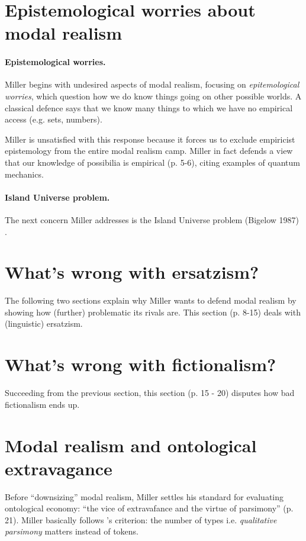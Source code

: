 \documentclass[
10pt, %
a4paper, %
twocolumn, %
landscape %
]{article}
\begin{document}
\section{Epistemological worries about modal realism}

\paragraph{Epistemological worries.}
 Miller begins with undesired aspects of modal realism, focusing on \emph{epitemological worries}, which question how we do know things going on other possible worlds.
 A classical defence says that we know many things to which we have no empirical access (e.g. sets, numbers).

 Miller is unsatisfied with this response because it forces us to exclude empiricist epistemology from the entire modal realism camp.
 Miller in fact defends a view that our knowledge of possibilia is empirical (p. 5-6), citing examples of quantum mechanics.

 \paragraph{Island Universe problem.}
 The next concern Miller addresses is the Island Universe problem (Bigelow 1987) \cite{Bigelow1987}.


\section{What's wrong with ersatzism?}
The following two sections explain why Miller wants to defend modal realism by showing how (further) problematic its rivals are. This section (p. 8-15) deals with (linguistic) ersatzism.

\section{What's wrong with fictionalism?}
Succeeding from the previous section, this section (p. 15 - 20) disputes how bad fictionalism ends up.

\section{Modal realism and ontological extravagance}
Before ``downsizing'' modal realism, Miller settles his standard for evaluating ontological economy: ``the vice of extravafance and the virtue of parsimony'' (p. 21).
Miller basically follows \cite{Lewis1986}'s criterion: the number of types i.e. \emph{qualitative parsimony} matters instead of tokens.
\end{document}
